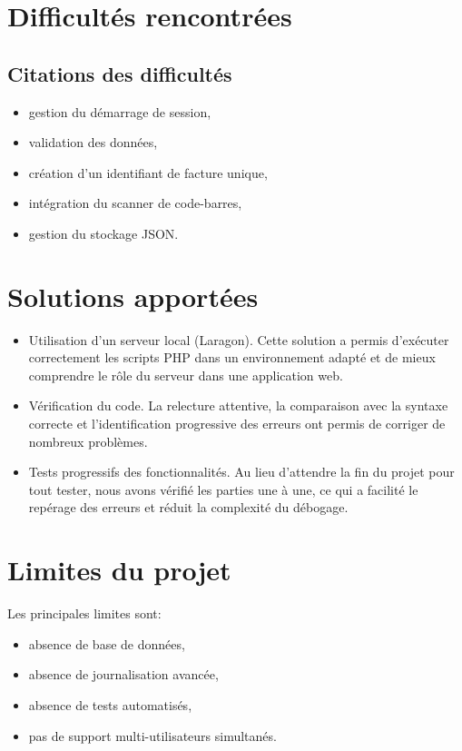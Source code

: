 \documentclass[12pt,a4paper]{article}
\begin{document}
\section{Difficultés rencontrées}
\subsection{Citations des difficultés}
\begin{itemize}
  \item gestion du démarrage de session,
  \item validation des données,
  \item création d'un identifiant de facture unique,
  \item intégration du scanner de code-barres,
  \item gestion du stockage JSON.
\end{itemize}


\section{Solutions apportées}
\begin{itemize}
\item Utilisation d'un serveur local (Laragon). Cette solution a permis d'exécuter correctement les scripts PHP dans un environnement adapté et de mieux comprendre le rôle du serveur dans une application web.
\item Vérification du code. La relecture attentive, la comparaison avec la syntaxe correcte et l'identification progressive des erreurs ont permis de corriger de nombreux problèmes.
\item Tests progressifs des fonctionnalités. Au lieu d'attendre la fin du projet pour tout tester, nous avons vérifié les parties une à une, ce qui a facilité le repérage des erreurs et réduit la complexité du débogage.
\end{itemize}

\section{Limites du projet}
Les principales limites sont:
\begin{itemize}
  \item absence de base de données,
  \item absence de journalisation avancée,
  \item absence de tests automatisés,
  \item pas de support multi-utilisateurs simultanés.
\end{itemize}
\end{document}
